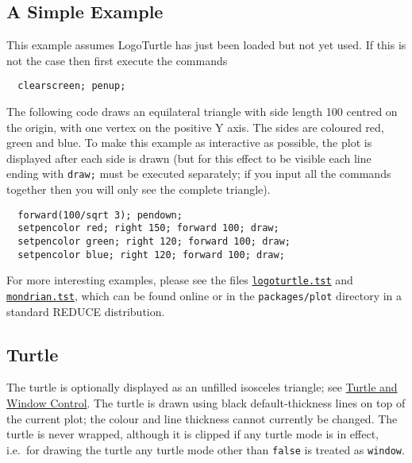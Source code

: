 \subsection{A Simple Example}

This example assumes LogoTurtle has just been loaded but not yet used.
If this is not the case then first execute the commands
\begin{verbatim}
  clearscreen; penup;
\end{verbatim}

The following code draws an equilateral triangle with side length 100
centred on the origin, with one vertex on the positive Y axis.  The
sides are coloured red, green and blue.  To make this example as
interactive as possible, the plot is displayed after each side is
drawn (but for this effect to be visible each line ending with
\texttt{draw;} must be executed separately; if you input all the
commands together then you will only see the complete triangle).
\begin{verbatim}
  forward(100/sqrt 3); pendown;
  setpencolor red; right 150; forward 100; draw;
  setpencolor green; right 120; forward 100; draw;
  setpencolor blue; right 120; forward 100; draw;
\end{verbatim}

For more interesting examples, please see the files
\href{https://sourceforge.net/p/reduce-algebra/code/HEAD/tree/trunk/packages/plot/logoturtle.tst}
     {\texttt{logoturtle.tst}} and
\href{https://sourceforge.net/p/reduce-algebra/code/HEAD/tree/trunk/packages/plot/mondrian.tst}
     {\texttt{mondrian.tst}}, which can be found online or in the
     \texttt{packages/plot} directory in a standard REDUCE
     distribution.


\subsection{Turtle}

The turtle is optionally displayed as an unfilled isosceles triangle;
see \hyperref[logoturtle:TWC]{Turtle and Window Control}.  The turtle
is drawn using black default-thickness lines on top of the current
plot; the colour and line thickness cannot currently be changed.  The
turtle is never wrapped, although it is clipped if any turtle mode is
in effect, i.e.\ for drawing the turtle any turtle mode other than
\texttt{false} is treated as \texttt{window}.

